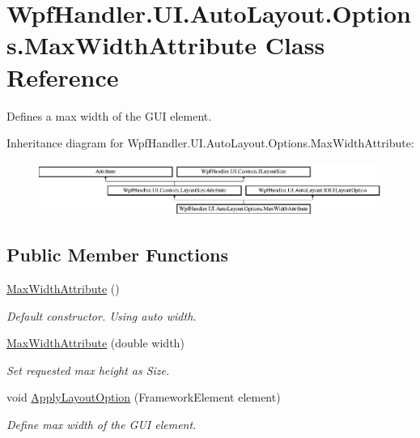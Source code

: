 \hypertarget{class_wpf_handler_1_1_u_i_1_1_auto_layout_1_1_options_1_1_max_width_attribute}{}\section{Wpf\+Handler.\+U\+I.\+Auto\+Layout.\+Options.\+Max\+Width\+Attribute Class Reference}
\label{class_wpf_handler_1_1_u_i_1_1_auto_layout_1_1_options_1_1_max_width_attribute}


Defines a max width of the G\+UI element.  


Inheritance diagram for Wpf\+Handler.\+U\+I.\+Auto\+Layout.\+Options.\+Max\+Width\+Attribute\+:\begin{figure}[H]
\begin{center}
\leavevmode
\includegraphics[height=1.733746cm]{de/d94/class_wpf_handler_1_1_u_i_1_1_auto_layout_1_1_options_1_1_max_width_attribute}
\end{center}
\end{figure}
\subsection*{Public Member Functions}
\begin{DoxyCompactItemize}
\item 
\mbox{\hyperlink{class_wpf_handler_1_1_u_i_1_1_auto_layout_1_1_options_1_1_max_width_attribute_a3429e7c52bbf6e67c2e712afad4631fe}{Max\+Width\+Attribute}} ()
\begin{DoxyCompactList}\small\item\em Default constructor. Using auto width. \end{DoxyCompactList}\item 
\mbox{\hyperlink{class_wpf_handler_1_1_u_i_1_1_auto_layout_1_1_options_1_1_max_width_attribute_acd322def2c9a5f6cd36b385d1acf2866}{Max\+Width\+Attribute}} (double width)
\begin{DoxyCompactList}\small\item\em Set requested max height as Size. \end{DoxyCompactList}\item 
void \mbox{\hyperlink{class_wpf_handler_1_1_u_i_1_1_auto_layout_1_1_options_1_1_max_width_attribute_ab7c7bf52114b1aa465f70debaeccf5f4}{Apply\+Layout\+Option}} (Framework\+Element element)
\begin{DoxyCompactList}\small\item\em Define max width of the G\+UI element. \end{DoxyCompactList}\end{DoxyCompactItemize}
